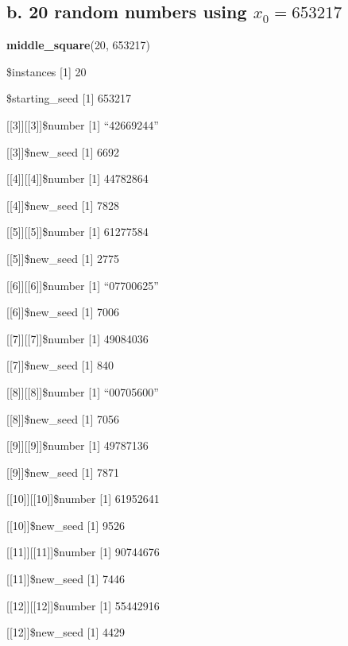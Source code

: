 \documentclass[]{article}
\newenvironment{Shaded}{\begin{snugshade}}{\end{snugshade}}
\newcommand{\KeywordTok}[1]{\textcolor[rgb]{0.13,0.29,0.53}{\textbf{{#1}}}}
\newcommand{\DecValTok}[1]{\textcolor[rgb]{0.00,0.00,0.81}{{#1}}}
\newcommand{\NormalTok}[1]{{#1}}
\begin{document}
\subsection{\texorpdfstring{b. 20 random numbers using
\(x_0 = 653217\)}{b. 20 random numbers using x\_0 = 653217}}\label{b.-20-random-numbers-using-x_0-653217}

\begin{Shaded}
\begin{Highlighting}[]
\KeywordTok{middle_square}\NormalTok{(}\DecValTok{20}\NormalTok{, }\DecValTok{653217}\NormalTok{)}
\end{Highlighting}
\end{Shaded}

\$instances {[}1{]} 20

\$starting\_seed {[}1{]} 653217

{[}{[}3{]}{]}{[}{[}3{]}{]}\$number {[}1{]} ``42669244''

{[}{[}3{]}{]}\$new\_seed {[}1{]} 6692

{[}{[}4{]}{]}{[}{[}4{]}{]}\$number {[}1{]} 44782864

{[}{[}4{]}{]}\$new\_seed {[}1{]} 7828

{[}{[}5{]}{]}{[}{[}5{]}{]}\$number {[}1{]} 61277584

{[}{[}5{]}{]}\$new\_seed {[}1{]} 2775

{[}{[}6{]}{]}{[}{[}6{]}{]}\$number {[}1{]} ``07700625''

{[}{[}6{]}{]}\$new\_seed {[}1{]} 7006

{[}{[}7{]}{]}{[}{[}7{]}{]}\$number {[}1{]} 49084036

{[}{[}7{]}{]}\$new\_seed {[}1{]} 840

{[}{[}8{]}{]}{[}{[}8{]}{]}\$number {[}1{]} ``00705600''

{[}{[}8{]}{]}\$new\_seed {[}1{]} 7056

{[}{[}9{]}{]}{[}{[}9{]}{]}\$number {[}1{]} 49787136

{[}{[}9{]}{]}\$new\_seed {[}1{]} 7871

{[}{[}10{]}{]}{[}{[}10{]}{]}\$number {[}1{]} 61952641

{[}{[}10{]}{]}\$new\_seed {[}1{]} 9526

{[}{[}11{]}{]}{[}{[}11{]}{]}\$number {[}1{]} 90744676

{[}{[}11{]}{]}\$new\_seed {[}1{]} 7446

{[}{[}12{]}{]}{[}{[}12{]}{]}\$number {[}1{]} 55442916

{[}{[}12{]}{]}\$new\_seed {[}1{]} 4429
\end{document}
